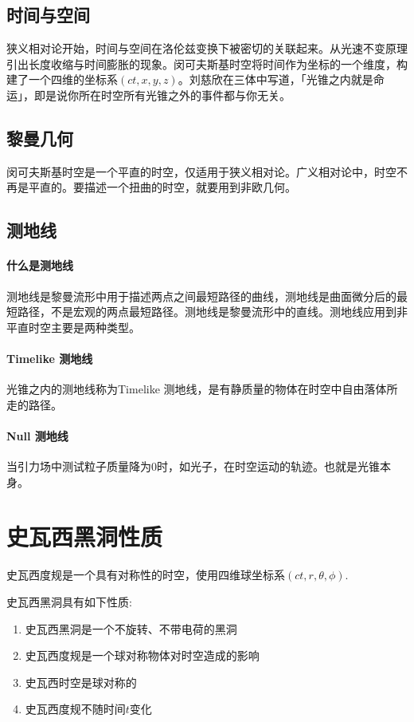 \subsection{时间与空间}
狭义相对论开始，时间与空间在洛伦兹变换下被密切的关联起来。从光速不变原理引出长度收缩与时间膨胀的现象。闵可夫斯基时空将时间作为坐标的一个维度，构建了一个四维的坐标系$\left(ct,x,y,z\right)$。刘慈欣在三体中写道，「光锥之内就是命运」\cite{three-body}，即是说你所在时空所有光锥之外的事件都与你无关。

\subsection{黎曼几何}
闵可夫斯基时空是一个平直的时空，仅适用于狭义相对论。广义相对论中，时空不再是平直的。要描述一个扭曲的时空，就要用到非欧几何。

\subsection{测地线}
\paragraph{什么是测地线}
测地线是黎曼流形中用于描述两点之间最短路径的曲线，测地线是曲面微分后的最短路径，不是宏观的两点最短路径。测地线是黎曼流形中的直线。测地线应用到非平直时空主要是两种类型。
\paragraph{Timelike 测地线}
光锥之内的测地线称为Timelike 测地线，是有静质量的物体在时空中自由落体所走的路径。
\paragraph{Null 测地线}
当引力场中测试粒子质量降为0时，如光子，在时空运动的轨迹。也就是光锥本身。


\section{史瓦西黑洞性质}
史瓦西度规是一个具有对称性的时空，使用四维球坐标系$\left(ct,r,\theta,\phi\right)$.

史瓦西黑洞具有如下性质:
\begin{enumerate}
    \item 史瓦西黑洞是一个不旋转、不带电荷的黑洞
    \item 史瓦西度规是一个球对称物体对时空造成的影响
    \item 史瓦西时空是球对称的
    \item 史瓦西度规不随时间$t$变化
\end{enumerate}

